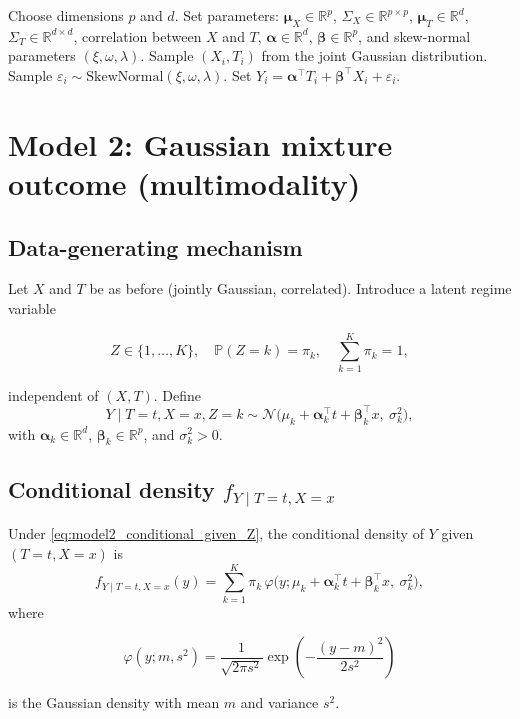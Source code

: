 \documentclass[11pt]{article}
\begin{document}
\begin{algorithm}[h]
\caption{Data generation for the skew-normal model}
\begin{algorithmic}[1]
\STATE Choose dimensions $p$ and $d$.
\STATE Set parameters: $\bm{\mu}_X \in \mathbb{R}^p$, $\Sigma_X \in \mathbb{R}^{p \times p}$, $\bm{\mu}_T \in \mathbb{R}^d$, $\Sigma_T \in \mathbb{R}^{d \times d}$, correlation between $X$ and $T$, $\bm{\alpha} \in \mathbb{R}^d$, $\bm{\beta} \in \mathbb{R}^p$, and skew-normal parameters $(\xi,\omega,\lambda)$.
    \STATE Sample $(X_i, T_i)$ from the joint Gaussian distribution.
    \STATE Sample $\varepsilon_i \sim \mathrm{SkewNormal}(\xi,\omega,\lambda)$.
    \STATE Set $Y_i = \bm{\alpha}^\top T_i + \bm{\beta}^\top X_i + \varepsilon_i$.
\ENDFOR
\end{algorithmic}
\end{algorithm}

\section{Model 2: Gaussian mixture outcome (multimodality)}

\subsection{Data-generating mechanism}

Let $X$ and $T$ be as before (jointly Gaussian, correlated).
Introduce a latent regime variable


\[
Z \in \{1,\dots,K\}, \quad \mathbb{P}(Z=k) = \pi_k,\quad \sum_{k=1}^K \pi_k = 1,
\]


independent of $(X,T)$.
Define
\begin{equation}
    Y \mid T=t, X=x, Z=k \sim \mathcal{N}\big(\mu_k + \bm{\alpha}_k^\top t + \bm{\beta}_k^\top x,\ \sigma_k^2\big),
    \label{eq:model2_conditional_given_Z}
\end{equation}
with $\bm{\alpha}_k \in \mathbb{R}^d$, $\bm{\beta}_k \in \mathbb{R}^p$, and $\sigma_k^2 > 0$.

\subsection{Conditional density $f_{Y \mid T=t, X=x}$}

\begin{theorem}
Under \eqref{eq:model2_conditional_given_Z}, the conditional density of $Y$ given $(T=t,X=x)$ is
\begin{equation}
    f_{Y \mid T=t, X=x}(y)
    = \sum_{k=1}^K \pi_k\, \varphi\big(y;\mu_k + \bm{\alpha}_k^\top t + \bm{\beta}_k^\top x,\ \sigma_k^2\big),
    \label{eq:model2_conditional_density}
\end{equation}
where


\[
\varphi(y;m,s^2)
= \frac{1}{\sqrt{2\pi s^2}} \exp\left(-\frac{(y-m)^2}{2s^2}\right)
\]


is the Gaussian density with mean $m$ and variance $s^2$.
\end{theorem}
\end{document}
